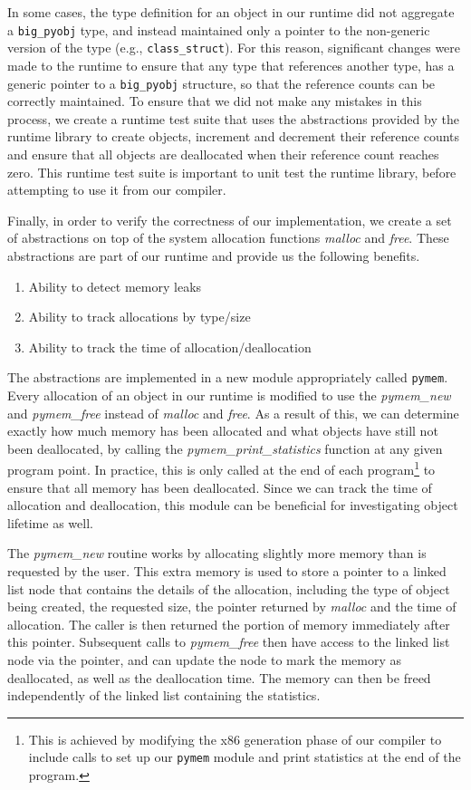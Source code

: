 \documentclass{sigplanconf}
\newcommand{\afunction}[1]{\textit{#1}}
\newcommand{\atype}[1]{\texttt{#1}}
\begin{document}
In some cases, the type definition for an object in our runtime did not aggregate a \atype{big\_pyobj} type, and instead maintained only a pointer to the non-generic version of the type (e.g., \atype{class\_struct}).  For this reason, significant changes were made to the runtime to ensure that any type that references another type, has a generic pointer to a \atype{big\_pyobj} structure, so that the reference counts can be correctly maintained.  To ensure that we did not make any mistakes in this process, we create a runtime test suite that uses the abstractions provided by the runtime library to create objects, increment and decrement their reference counts and ensure that all objects are deallocated when their reference count reaches zero.  This runtime test suite is important to unit test the runtime library, before attempting to use it from our compiler.

Finally, in order to verify the correctness of our implementation, we create a set of abstractions on top of the system allocation functions \afunction{malloc} and \afunction{free}.  These abstractions are part of our runtime and provide us the following benefits. 

\begin{enumerate}
\item Ability to detect memory leaks
\item Ability to track allocations by type/size
\item Ability to track the time of allocation/deallocation
\end{enumerate}

The abstractions are implemented in a new module appropriately called \texttt{pymem}.  Every allocation of an object in our runtime is modified to use the \afunction{pymem\_new} and \afunction{pymem\_free} instead of \afunction{malloc} and \afunction{free}. As a result of this, we can determine exactly how much memory has been allocated and what objects have still not been deallocated, by calling the \afunction{pymem\_print\_statistics} function at any given program point.  In practice, this is only called at the end of each program\footnote{This is achieved by modifying the x86 generation phase of our compiler to include calls to set up our \texttt{pymem} module and print statistics at the end of the program. } to ensure that all memory has been deallocated.  Since we can track the time of allocation and deallocation, this module can be beneficial for investigating object lifetime as well.  

The \afunction{pymem\_new} routine works by allocating slightly more memory than is requested by the user.  This extra memory is used to store a pointer to a linked list node that contains the details of the allocation, including the type of object being created, the requested size, the pointer returned by \afunction{malloc} and the time of allocation.  The caller is then returned the portion of memory immediately after this pointer.  Subsequent calls to \afunction{pymem\_free} then have access to the linked list node via the pointer, and can update the node to mark the memory as deallocated, as well as the deallocation time.  The memory can then be freed independently of the linked list containing the statistics. 
\end{document}
